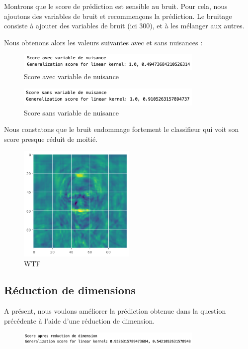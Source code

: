 \documentclass[a4paper,12pt]{article}
\begin{document}
Montrons que le score de prédiction est sensible au bruit. Pour cela, nous ajoutons des variables de bruit et
recommençons la prédiction. Le bruitage consiste à ajouter des variables de bruit (ici 300), et à les mélanger aux autres. 

Nous obtenons alors les valeurs suivantes avec et sans nuisances :

\begin{figure}[H]
    \centering
    \includegraphics[width=0.8\textwidth]{Images/avec_variable.png}
    \caption{Score avec variable de nuisance}\label{fig: avec}
\end{figure}

\begin{figure}[H]
    \centering
    \includegraphics[width=0.8\textwidth]{Images/sans_variable.png}
    \caption{Score sans variable de nuisance}\label{fig: sans}
\end{figure}

Nous constatons que le bruit endommage fortement le classifieur qui voit son score presque réduit de moitié.

\begin{figure}[H]
    \centering
    \includegraphics[width=0.5\textwidth]{Images/coeff_visage.png}
    \caption{WTF}\label{fig : ?}
\end{figure}

\subsection{Réduction de dimensions}

A présent, nous voulons améliorer la prédiction obtenue dans la question précédente à l'aide d'une réduction de
dimension.
\begin{figure}[H]
    \centering
    \includegraphics[width=0.8\textwidth]{Images/apres_reduction.png}
    \caption{}\label{fig : dim}
\end{figure}
\end{document}
